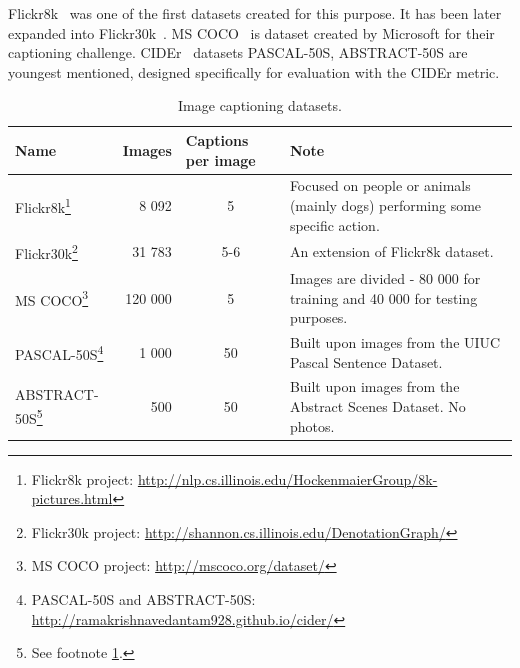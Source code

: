 Flickr8k~\cite{dataset-flickr8k} was one of the first datasets created for this purpose. It has been later expanded into Flickr30k~\cite{dataset-flickr30k}. MS COCO~\cite{DBLP:journals/corr/ChenFLVGDZ15} is dataset created by Microsoft for their captioning challenge. CIDEr~\cite{Vedantam_2015_CVPR} datasets PASCAL-50S, ABSTRACT-50S are youngest mentioned, designed specifically for evaluation with the CIDEr metric.

\def\arraystretch{1.2}%

\begin{center}
	\begin{longtable}{|l|m{2cm}|m{2cm}|m{4.7cm}|}
		\caption{Image captioning datasets.} \label{tab:datasets} \\

	   	\hline
	   	\multicolumn{1}{|l|}{\textbf{Name}} &
	   	\textbf{Images} &
	   	\textbf{Captions per image} &
	   	\textbf{Note} \\
	   	\hline \hline
		\endhead

	   	Flickr8k\footnote{Flickr8k project: \url{http://nlp.cs.illinois.edu/HockenmaierGroup/8k-pictures.html}} &
		   	\multicolumn{1}{r|}{8 092} &
		   	\multicolumn{1}{c|}{5} &
		   	Focused on people or animals (mainly dogs) performing some specific action. \\ \hline
	   	Flickr30k\footnote{Flickr30k project: \url{http://shannon.cs.illinois.edu/DenotationGraph/}} &
		   	\multicolumn{1}{r|}{31 783} &
		   	\multicolumn{1}{c|}{5-6} &
		   	An extension of Flickr8k dataset. \\ \hline
	   	MS COCO\footnote{MS COCO project: \url{http://mscoco.org/dataset/}} &
		   	\multicolumn{1}{r|}{120 000} &
		   	\multicolumn{1}{c|}{5} &
		   	Images are divided - 80 000 for training and 40 000 for testing purposes. \\ \hline
	   	PASCAL-50S\footnote{\label{ft:cider}PASCAL-50S and ABSTRACT-50S: \url{http://ramakrishnavedantam928.github.io/cider/}} &
		   	\multicolumn{1}{r|}{1 000} &
		   	\multicolumn{1}{c|}{50} &
		   	Built upon images from the UIUC Pascal Sentence Dataset. \\ \hline
	   	ABSTRACT-50S\footnote{See footnote \ref{ft:cider}.} &
		   	\multicolumn{1}{r|}{500} &
		   	\multicolumn{1}{c|}{50} &
		   	Built upon images from the Abstract Scenes Dataset. No photos.\\ \hline
	\end{longtable}
\end{center}

